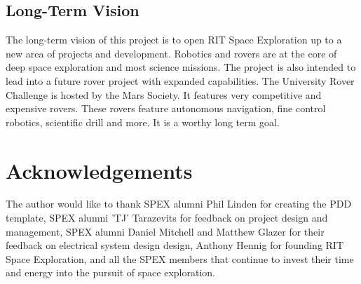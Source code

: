\documentclass[conference]{IEEEtran} %
\begin{document}
\subsection{Long-Term Vision}
\label{subsec:vision}
The long-term vision of this project is to open RIT Space Exploration up to a new area of projects and development. 
Robotics and rovers are at the core of deep space exploration and most science missions. 
The project is also intended to lead into a future rover project with expanded capabilities.
The University Rover Challenge is hosted by the Mars Society. 
It features very competitive and expensive rovers. 
These rovers feature autonomous navigation, fine control robotics, scientific drill and more. 
It is a worthy long term goal. 

\section*{Acknowledgements}
The author would like to thank SPEX alumni Phil Linden for creating the PDD template, SPEX alumni 'TJ' Tarazevits for feedback on project design and management, SPEX alumni Daniel Mitchell and Matthew Glazer for their feedback on electrical system design design, Anthony Hennig for founding RIT Space Exploration, and all the SPEX members that continue to invest their time and energy into the pursuit of space exploration.

\onecolumn
\appendices{}
\end{document}
